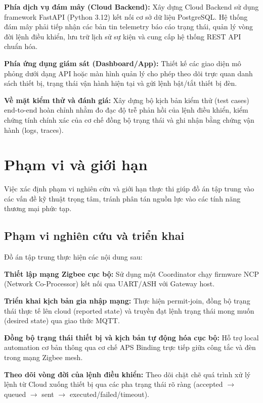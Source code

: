 \textbf{Phía dịch vụ đám mây (Cloud Backend):} Xây dựng Cloud Backend sử dụng framework FastAPI (Python 3.12) kết nối cơ sở dữ liệu PostgreSQL. Hệ thống đám mây phải tiếp nhận các bản tin telemetry báo cáo trạng thái, quản lý vòng đời lệnh điều khiển, lưu trữ lịch sử sự kiện và cung cấp hệ thống REST API chuẩn hóa.

\textbf{Phía ứng dụng giám sát (Dashboard/App):} Thiết kế các giao diện mô phỏng dưới dạng API hoặc màn hình quản lý cho phép theo dõi trực quan danh sách thiết bị, trạng thái vận hành hiện tại và gửi lệnh bật/tắt thiết bị đèn.

\textbf{Về mặt kiểm thử và đánh giá:} Xây dựng bộ kịch bản kiểm thử (test cases) end-to-end hoàn chỉnh nhằm đo đạc độ trễ phản hồi của lệnh điều khiển, kiểm chứng tính chính xác của cơ chế đồng bộ trạng thái và ghi nhận bằng chứng vận hành (logs, traces).

\newpage
\section{Phạm vi và giới hạn}
\label{sec:ch1-phamvi}

Việc xác định phạm vi nghiên cứu và giới hạn thực thi giúp đồ án tập trung vào các vấn đề kỹ thuật trọng tâm, tránh phân tán nguồn lực vào các tính năng thương mại phức tạp.

\subsection{Phạm vi nghiên cứu và triển khai}
Đồ án tập trung thực hiện các nội dung sau:

\textbf{Thiết lập mạng Zigbee cục bộ:} Sử dụng một Coordinator chạy firmware NCP (Network Co-Processor) kết nối qua UART/ASH với Gateway host.

\textbf{Triển khai kịch bản gia nhập mạng:} Thực hiện permit-join, đồng bộ trạng thái thực tế lên cloud (reported state) và truyền đạt lệnh trạng thái mong muốn (desired state) qua giao thức MQTT.

\textbf{Đồng bộ trạng thái thiết bị và kịch bản tự động hóa cục bộ:} Hỗ trợ local automation cơ bản thông qua cơ chế APS Binding trực tiếp giữa công tắc và đèn trong mạng Zigbee mesh.

\textbf{Theo dõi vòng đời của lệnh điều khiển:} Theo dõi chặt chẽ quá trình xử lý lệnh từ Cloud xuống thiết bị qua các pha trạng thái rõ ràng (accepted $\rightarrow$ queued $\rightarrow$ sent $\rightarrow$ executed/failed/timeout).

